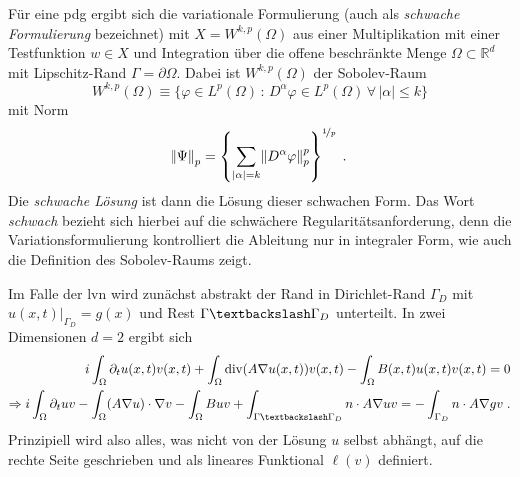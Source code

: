  Für eine \ac{pdg} ergibt sich die variationale Formulierung (auch als \emph{schwache Formulierung} bezeichnet) mit ${X=W^{k,p}(\Omega)}$ aus einer Multiplikation mit einer Testfunktion ${w\in X}$ und Integration über die offene beschränkte Menge ${\Omega \subset \mathbb{R}^d}$ mit Lipschitz-Rand $\Gamma = \partial\Omega$.
 Dabei ist ${W^{k,p}(\Omega)}$ der Sobolev-Raum
 \begin{equation*}
   W^{k,p}(\Omega) \equiv \{ \varphi \in L^p(\Omega) \, : \, D^{\alpha}\varphi \in L^p(\Omega) \, \forall \, |\alpha| \leq k\}
 \end{equation*}
 mit Norm
 \begin{equation*}
   \norm{\Psi}_p = \left\{ \sum_{|\alpha|=k}\norm{D^{\alpha}\varphi}_p^p\right\}^{\nicefrac{1}{p}} \; .
 \end{equation*}
 Die \emph{schwache Lösung} ist dann die Lösung dieser schwachen Form. Das Wort \emph{schwach} bezieht sich hierbei auf die schwächere Regularitätsanforderung, denn die Variationsformulierung kontrolliert die Ableitung nur in integraler Form, wie auch die Definition des Sobolev-Raums zeigt.

 Im Falle der \ac{lvn} wird zunächst abstrakt der Rand in Dirichlet-Rand $\Gamma_D$ mit ${u(x,t)|_{\Gamma_D} = g(x)}$ und Rest ${\Gamma\textbackslash\Gamma_D}$ unterteilt. In zwei Dimensionen $d=2$ ergibt sich
 \begin{align*}
              i \int_{\Omega} \partial_t u(x,t) v(x,t) + \int_{\Omega}\operatorname{div}(A\nabla u(x,t)) v(x,t) - \int_{\Omega}B(x,t) u(x,t) v(x,t) = 0 \\
  \Rightarrow i \int_{\Omega} \partial_t u v - \int_{\Omega}(A\nabla u)\cdot\nabla v - \int_{\Omega}B u v + \int_{\Gamma\textbackslash\Gamma_D} n \cdot A\nabla u v = - \int_{\Gamma_D} n \cdot A\nabla g v \; .
\end{align*}
 Prinzipiell wird also alles, was nicht von der Lösung $u$ selbst abhängt, auf die rechte Seite geschrieben und als lineares Funktional $\ell(v)$ definiert.

